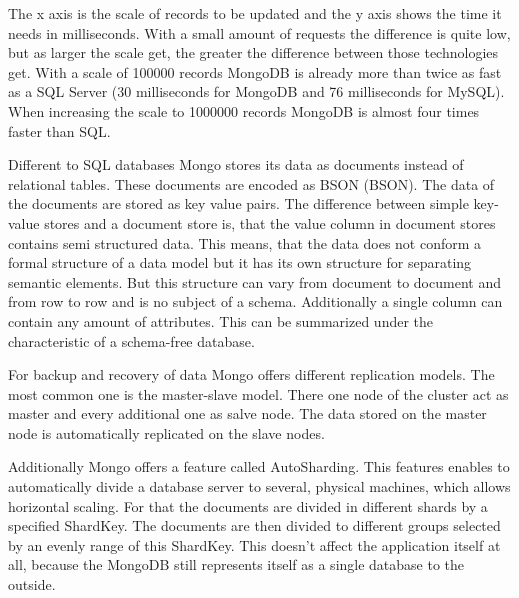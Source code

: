 
The x axis is the scale of records to be updated and the y axis shows the time it needs in milliseconds. With a small amount of requests the difference is quite low, but as larger the scale get, the greater the difference between those technologies get. With a scale of 100000 records MongoDB is already more than twice as fast as a SQL Server (30 milliseconds for MongoDB and 76 milliseconds for MySQL). When increasing the scale to 1000000 records MongoDB is almost four times faster than SQL.

Different to SQL databases Mongo stores its data as documents instead of relational tables. These documents are encoded as \acs{BSON} (\acl{BSON}). The data of the documents are stored as key value pairs. The difference between simple key-value stores and a document store is, that the value column in document stores contains semi structured data. This means, that the data does not conform a formal structure of a data model but it has its own structure for separating semantic elements. But this structure can vary from document to document and from row to row and is no subject of a schema. Additionally a single column can contain any amount of attributes. This can be summarized under the characteristic of a schema-free database.


For backup and recovery of data Mongo offers different replication models. The most common one is the master-slave model. There one node of the cluster act as master and every additional one as salve node. The data stored on the master node is automatically replicated on the slave nodes.

Additionally Mongo offers a feature called AutoSharding. This features enables to automatically divide a database server to several, physical machines, which allows horizontal scaling. For that the documents are divided in different shards by a specified ShardKey. The documents are then divided to different groups selected by an evenly range of this ShardKey. This doesn't affect the application itself at all, because the MongoDB still represents itself as a single database to the outside.

